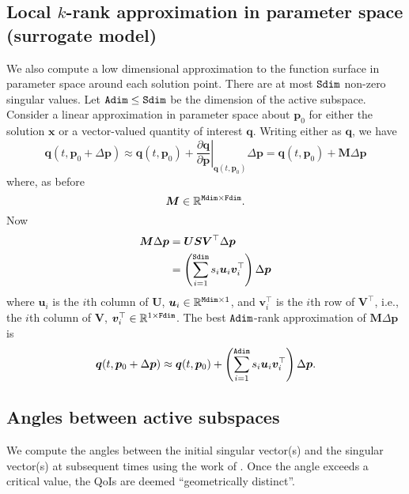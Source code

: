 \documentclass{siamltex}
\newcommand{\pvec}{\bm{p}}
\newcommand{\qvec}{\bm{q}}
\newcommand{\uvec}{\bm{u}}
\newcommand{\vvec}{\bm{v}}
\newcommand{\xvec}{\bm{x}}
\newcommand{\Mmat}{\bm{M}}
\newcommand{\Smat}{\bm{S}}
\newcommand{\Umat}{\bm{U}}
\newcommand{\Vmat}{\bm{V}}
\newcommand{\reals}{\mathbb R}
\newcommand{\Adim}{{\tt Adim}}
\newcommand{\Mdim}{{\tt Mdim}}
\newcommand{\Sdim}{{\tt Sdim}}
\newcommand{\Fdim}{{\tt Fdim}}
\begin{document}
\subsection{Local $k$-rank approximation in parameter space (surrogate model)}
We also compute a low dimensional approximation to the function surface in parameter space around each solution point. There are at most $\Sdim$ non-zero singular values. Let $\Adim \le \Sdim$ be the dimension of the active subspace. Consider a linear approximation in parameter space about $\pvec_0$ for either the solution $\xvec$ or a vector-valued quantity of interest $\qvec$. Writing either as $\qvec$, we have
\begin{equation}
\qvec(t,\pvec_0+\Delta \pvec) \approx
\qvec(t,\pvec_0) + \left . \frac{\partial \qvec}{\partial \pvec} \right\vert_{\qvec(t,\pvec_0)}
                   \Delta \pvec
= \qvec(t,\pvec_0) + \Mmat \Delta \pvec
\end{equation}
where, as before
\begin{equation}
\Mmat \in \reals^{\Mdim\times\Fdim}.
\end{equation}
Now
\begin{equation}
\begin{aligned}
\Mmat \Delta \pvec &= \Umat \Smat \Vmat^\top \Delta \pvec \\
&= \left(\sum_{i=1}^{\Sdim} s_i \uvec_i \vvec_i^\top \right)\Delta \pvec
\end{aligned}
\end{equation}
where $\uvec_i$ is the $i$th column of $\Umat$, $\uvec_i \in \reals^{\Mdim\times 1}$, and $\vvec_i^\top$ is the $i$th row of $\Vmat^\top$, i.e., the $i$th column of $\Vmat$,  $\vvec_i^\top \in \reals^{1 \times \Fdim}$. The best $\Adim$-rank approximation of $\Mmat \Delta\pvec$ is
\begin{equation}\label{eq:f_active_subspace_approx}
\qvec(t,\pvec_0+\Delta \pvec) \approx \qvec(t,\pvec_0) + \left(\sum_{i=1}^{\Adim} s_i \uvec_i \vvec_i^\top \right) \Delta \pvec.
\end{equation}

\subsection{Angles between active subspaces}
We compute the angles between the initial singular vector(s) and the singular vector(s) at subsequent times using the work of \cite{Shonkwiler}. Once the angle exceeds a critical value, the QoIs are deemed ``geometrically distinct''.
\end{document}
